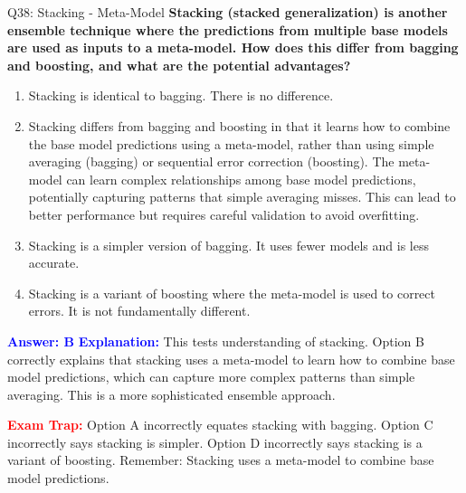 \documentclass[8pt]{beamer}
\begin{document}
	\begin{frame}{Q38: Stacking - Meta-Model}
		\fontsize{6.5}{7.5}\selectfont
		\textbf{Stacking (stacked generalization) is another ensemble technique where the predictions from multiple base models are used as inputs to a meta-model. How does this differ from bagging and boosting, and what are the potential advantages?}
		
		\begin{enumerate}
			\item Stacking is identical to bagging. There is no difference.
			\item Stacking differs from bagging and boosting in that it learns how to combine the base model predictions using a meta-model, rather than using simple averaging (bagging) or sequential error correction (boosting). The meta-model can learn complex relationships among base model predictions, potentially capturing patterns that simple averaging misses. This can lead to better performance but requires careful validation to avoid overfitting.
			\item Stacking is a simpler version of bagging. It uses fewer models and is less accurate.
			\item Stacking is a variant of boosting where the meta-model is used to correct errors. It is not fundamentally different.
		\end{enumerate}
		
		\vspace{0.1cm}
		\textcolor{blue}{\textbf{Answer: B}}
		\vspace{0.1cm}
		\textcolor{blue}{\textbf{Explanation:}} This tests understanding of stacking. Option B correctly explains that stacking uses a meta-model to learn how to combine base model predictions, which can capture more complex patterns than simple averaging. This is a more sophisticated ensemble approach.
		
		\textcolor{red}{\textbf{Exam Trap:}} Option A incorrectly equates stacking with bagging. Option C incorrectly says stacking is simpler. Option D incorrectly says stacking is a variant of boosting. Remember: Stacking uses a meta-model to combine base model predictions.
	\end{frame}
	
\end{document}
